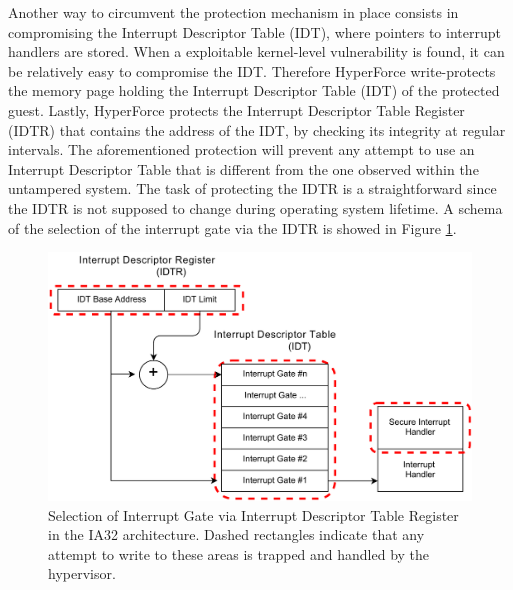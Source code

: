 Another way to circumvent the protection mechanism in place consists in compromising the Interrupt Descriptor Table (IDT), where pointers to interrupt handlers are stored. When a exploitable kernel-level vulnerability is found, it can be relatively easy to compromise the IDT. 
Therefore HyperForce write-protects the memory page holding the Interrupt Descriptor Table (IDT) of the protected guest. Lastly, HyperForce protects the Interrupt Descriptor Table Register (IDTR) that contains the address of the IDT, by checking its integrity at regular intervals. The aforementioned protection will prevent any attempt to use an Interrupt Descriptor Table that is different from the one observed within the untampered system.
The task of protecting the IDTR is a straightforward since the IDTR is not supposed to change during operating system lifetime. A schema of the selection of the interrupt gate via the IDTR is showed in Figure \ref{idtr}.



\begin{figure}
\begin{center}
\includegraphics[scale=0.5]{images/IDTR.pdf}
\caption{Selection of Interrupt Gate via Interrupt Descriptor Table Register in the IA32 architecture. Dashed rectangles indicate that any attempt to write to these areas is trapped and handled by the hypervisor.}
\label{idtr}
\end{center}
\end{figure}



